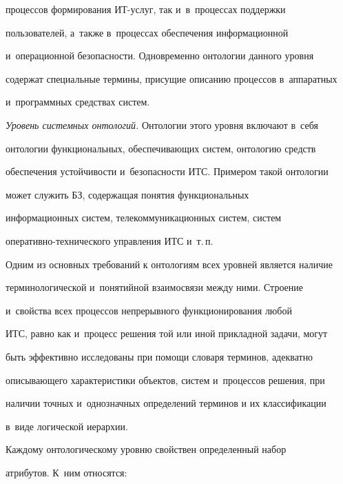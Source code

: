 процессов формирования ИТ-услуг, так и~в~процессах поддержки


пользователей, а~так\-же в~процессах обеспечения информационной


и~операционной безопасности. Одновременно онтологии данного уровня


содержат специальные термины, присущие описанию процессов в~аппаратных


и~программных средствах систем.





  \textit{Уровень системных онтологий.} Онтологии этого уровня включают в~себя


онтологии функциональных, обеспечивающих систем, онтологию средств


обеспечения устойчивости и~безопасности ИТС. Примером такой онтологии


может служить БЗ, содержащая понятия функциональных


информационных систем, телекоммуникационных систем, систем


  опе\-ра\-тив\-но-тех\-ни\-че\-ско\-го управ\-ле\-ния ИТС и~т.\,п.





  Одним из основных требований к онтологиям всех уровней является наличие


терминологической и~понятийной взаимосвязи между ними. Строение


и~свойства всех процессов непрерывного функционирования любой


ИТС, равно как и~процесс решения той или иной прикладной задачи, могут


быть эффективно исследованы при помощи словаря терминов, адекватно


описывающего характеристики объектов, систем и~процессов решения, при


наличии точных и~однозначных определений терминов и их классификации


в~виде логической иерархии.





  Каждому онтологическому уровню свойствен определенный набор


атрибутов. К~ним относятся:


